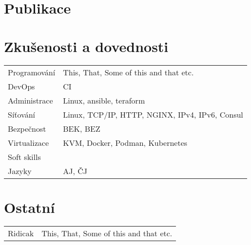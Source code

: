 \documentclass[a4paper,12pt]{article}
\begin{document}
\section{Publikace}
\begin{refsection}
\nocite{*}
\printbibliography[heading=none]
\end{refsection}

\section{Zkušenosti a dovednosti}
\begin{tabularx}{\linewidth}{@{}l X@{}}
Programování &  \normalsize{This, That, Some of this and that etc.}\\
DevOps &  \normalsize{CI}\\
Administrace &  \normalsize{Linux, ansible, teraform}\\
Síťování & Linux, TCP/IP, HTTP, NGINX, IPv4, IPv6, Consul\\
Bezpečnost & BEK, BEZ\\
Virtualizace & KVM, Docker, Podman, Kubernetes \\
Soft skills \\
Jazyky & AJ, ČJ\\
\end{tabularx}

\section{Ostatní}
\begin{tabularx}{\linewidth}{@{}l X@{}}
Ridicak &  \normalsize{This, That, Some of this and that etc.}\\
\end{tabularx}

\vfill
{}
\end{document}
